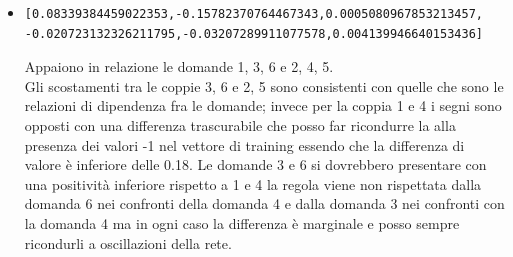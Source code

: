 \begin{itemize}
\item \begin{verbatim}[0.08339384459022353,-0.15782370764467343,0.0005080967853213457,
-0.020723132326211795,-0.03207289911077578,0.004139946640153436]
\end{verbatim}
Appaiono in relazione le domande 1, 3, 6 e 2, 4, 5.\\
Gli scostamenti tra le coppie 3, 6 e 2, 5 sono consistenti con quelle che sono le relazioni di dipendenza fra le domande; invece per la coppia 1 e 4 i segni sono opposti con una differenza trascurabile che posso far ricondurre la alla presenza dei valori -1 nel vettore di training essendo che la differenza di valore \`e inferiore delle 0.18.
Le domande 3 e 6 si dovrebbero presentare con una positivit\`a inferiore rispetto a 1 e 4 la regola viene non rispettata dalla domanda 6 nei confronti della domanda 4  e dalla domanda 3 nei confronti con la domanda 4 ma in ogni caso la differenza \`e marginale  e posso sempre ricondurli a oscillazioni della  rete.
\end{itemize}


